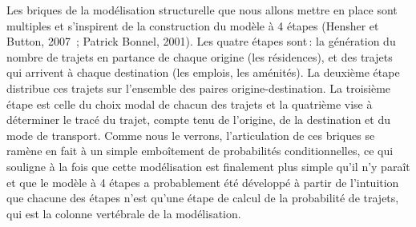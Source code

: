 \documentclass[
  9pt,
  a4paper,
  DIV=11]{scrreprt}
\begin{document}
Les briques de la modélisation structurelle que nous allons mettre en
place sont multiples et s'inspirent de la construction du modèle à 4
étapes (Hensher et Button, 2007~; Patrick Bonnel, 2001). Les quatre
étapes sont\,: la génération du nombre de trajets en partance de chaque
origine (les résidences), et des trajets qui arrivent à chaque
destination (les emplois, les aménités). La deuxième étape distribue ces
trajets sur l'ensemble des paires origine-destination. La troisième
étape est celle du choix modal de chacun des trajets et la quatrième
vise à déterminer le tracé du trajet, compte tenu de l'origine, de la
destination et du mode de transport. Comme nous le verrons,
l'articulation de ces briques se ramène en fait à un simple emboîtement
de probabilités conditionnelles, ce qui souligne à la fois que cette
modélisation est finalement plus simple qu'il n'y paraît et que le
modèle à 4 étapes a probablement été développé à partir de l'intuition
que chacune des étapes n'est qu'une étape de calcul de la probabilité de
trajets, qui est la colonne vertébrale de la modélisation.
\end{document}
